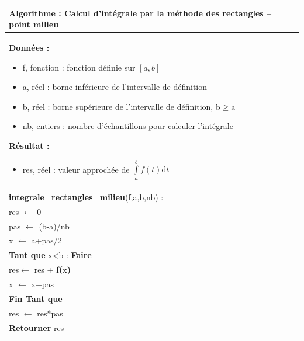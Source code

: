 \documentclass[10pt]{article}
\begin{document}
\begin{pseudo}
\begin{center}
\begin{tabular}{p{}}
\hline
\textbf{Algorithme :} Calcul d'intégrale par la méthode des rectangles -- point milieu\\
\hline
\textbf{Données :}
\begin{itemize}
\item \textsf{f}, fonction : fonction définie sur $[a,b]$  
\item \textsf{a}, réel : borne inférieure de l'intervalle de définition
\item \textsf{b}, réel : borne supérieure de l'intervalle de définition, \textsf{b$\geq$a}
\item \textsf{nb}, entiers : nombre d'échantillons pour calculer l'intégrale
\end{itemize}
\textbf{Résultat :} 
\begin{itemize}
\item \textsf{res}, réel : valeur approchée de $\int\limits_a^b f(t)\text{d}t$
\end{itemize}
\\
\textbf{integrale\_rectangles\_milieu}(\textsf{f,a,b,nb}) :\\
\hspace{.4cm}\textsf{res} $\leftarrow$ \textsf{0}\\
\hspace{.4cm}\textsf{pas} $\leftarrow$ \textsf{(b-a)/nb}\\
\hspace{.4cm}\textsf{x} $\leftarrow$ \textsf{a+pas/2}\\
\hspace{.4cm}\textbf{Tant que} \textsf{x<b} : \textbf{Faire}\\
\hspace{.8cm}\textsf{res}$\leftarrow$ \textsf{res + } 
\textbf{f(}\textsf{x}\textbf{)}\\
\hspace{.8cm}\textsf{x} $\leftarrow$ \textsf{x+pas}\\
\hspace{.4cm}\textbf{Fin Tant que} \\
\hspace{.4cm}\textsf{res} $\leftarrow$ \textsf{res*pas}\\
\hspace{.4cm}\textbf{Retourner} \textsf{res}\\
\hline
\end{tabular}
\end{center}
\end{pseudo}
\end{document}
